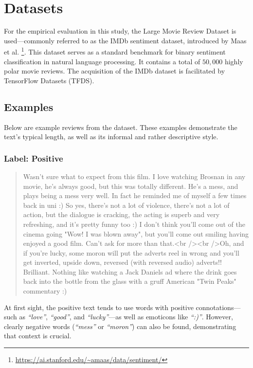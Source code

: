 \documentclass[a4paper,twoside,12pt]{book}
\newcommand{\literal}[1]{\textit{``#1''}}
\begin{document}
\section{Datasets}

For the empirical evaluation in this study, the Large Movie Review Dataset is used---commonly referred to as the IMDb sentiment dataset, introduced by Maas et al. \cite{Maas2011imdb}\footnote{\url{https://ai.stanford.edu/~amaas/data/sentiment/}}. This dataset serves as a standard benchmark for binary sentiment classification in natural language processing. It contains a total of $50{,}000$ highly polar movie reviews. The acquisition of the IMDb dataset is facilitated by TensorFlow Datasets (TFDS).

\subsection{Examples}

Below are example reviews from the dataset. These examples demonstrate the text's typical length, as well as its informal and rather descriptive style.

\subsubsection{Label: Positive}

\begin{quote}	
	Wasn't sure what to expect from this film. I love watching Brosnan in any movie, he's always good, but this was totally different. He's a mess, and plays being a mess very well. In fact he reminded me of myself a few times back in uni :) So yes, there's not a lot of violence, there's not a lot of action, but the dialogue is cracking, the acting is superb and very refreshing, and it's pretty funny too :) I don't think you'll come out of the cinema going "Wow! I was blown away", but you'll come out smiling having enjoyed a good film. Can't ask for more than that.<br /><br />Oh, and if you're lucky, some moron will put the adverts reel in wrong and you'll get inverted, upside down, reversed (with reversed audio) adverts!! Brilliant. Nothing like watching a Jack Daniels ad where the drink goes back into the bottle from the glass with a gruff American "Twin Peaks" commentary :)
\end{quote}

At first sight, the positive text tends to use words with positive connotations---such as \literal{love}, \literal{good}, and \literal{lucky}---as well as emoticons like \literal{:)}. However, clearly negative words (\literal{mess} or \literal{moron}) can also be found, demonstrating that context is crucial.
\end{document}
